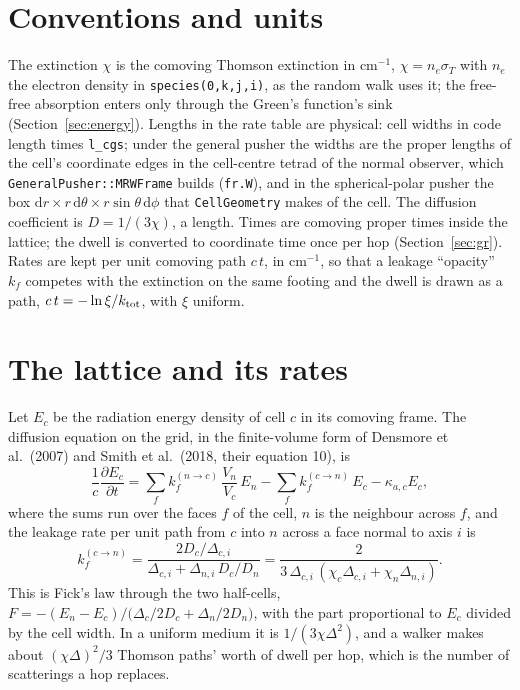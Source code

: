 \documentclass[11pt]{article}
\newcommand{\key}[1]{\texttt{#1}}
\newcommand{\dd}{\mathrm{d}}
\begin{document}
\section{Conventions and units}
\label{sec:units}

The extinction $\chi$ is the comoving Thomson extinction in cm$^{-1}$, $\chi=n_e
\sigma_T$ with $n_e$ the electron density in \texttt{species(0,k,j,i)}, as the random
walk uses it; the free-free absorption enters only through the Green's function's sink
(Section~\ref{sec:energy}).  Lengths in the rate table are physical: cell widths in
code length times \key{l\_cgs}; under the general pusher the widths are the proper
lengths of the cell's coordinate edges in the cell-centre tetrad of the normal observer,
which \texttt{GeneralPusher::MRWFrame} builds (\texttt{fr.W}), and in the
spherical-polar pusher the box $\dd r\times r\,\dd\theta\times r\sin\theta\,\dd\phi$
that \texttt{CellGeometry} makes of the cell.  The diffusion coefficient is
$D=1/(3\chi)$, a length.  Times are comoving proper times inside the lattice; the dwell
is converted to coordinate time once per hop (Section~\ref{sec:gr}).  Rates are kept per
unit comoving path $c\,t$, in cm$^{-1}$, so that a leakage ``opacity'' $k_f$ competes
with the extinction on the same footing and the dwell is drawn as a path, $c\,t = -\ln
\xi/k_{\rm tot}$, with $\xi$ uniform.

\section{The lattice and its rates}
\label{sec:rates}

Let $E_c$ be the radiation energy density of cell $c$ in its comoving frame.  The
diffusion equation on the grid, in the finite-volume form of Densmore et al.\ (2007)
and Smith et al.\ (2018, their equation 10), is
\begin{equation}
  \frac{1}{c}\frac{\partial E_c}{\partial t}
  = \sum_{f} k_f^{(n\to c)}\,\frac{V_n}{V_c}\,E_n - \sum_f k_f^{(c\to n)}\,E_c
  - \kappa_{a,c}E_c ,
\end{equation}
where the sums run over the faces $f$ of the cell, $n$ is the neighbour across $f$, and
the leakage rate per unit path from $c$ into $n$ across a face normal to axis $i$ is
\begin{equation}
  k_f^{(c\to n)} = \frac{2D_c/\Delta_{c,i}}{\Delta_{c,i} + \Delta_{n,i}\,D_c/D_n}
  = \frac{2}{3\,\Delta_{c,i}\,(\chi_c\Delta_{c,i} + \chi_n\Delta_{n,i})} .
  \label{eq:kint}
\end{equation}
This is Fick's law through the two half-cells, $F = -(E_n - E_c)/\bigl(\Delta_c/2D_c +
\Delta_n/2D_n\bigr)$, with the part proportional to $E_c$ divided by the cell width.
In a uniform medium it is $1/(3\chi\Delta^2)$, and a walker makes about
$(\chi\Delta)^2/3$ Thomson paths' worth of dwell per hop, which is the number of
scatterings a hop replaces.
\end{document}
